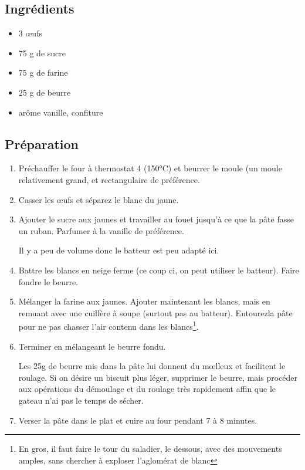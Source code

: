 \subsection*{Ingrédients}
\begin{itemize}
\item 3 œufs
\item 75 g de sucre
\item 75 g de farine
\item 25 g de beurre
\item arôme vanille, confiture
\end{itemize}

\subsection*{Préparation}
\begin{enumerate}
\item Préchauffer le four à thermostat 4 (150°C) et beurrer le moule (un moule relativement grand, et rectangulaire de préférence.
\item Casser les œufs et séparez le blanc du jaune.
\item Ajouter le sucre aux jaunes et travailler au fouet jusqu'à ce que la pâte fasse un ruban. Parfumer à la vanille de préférence.
\begin{remarque}
Il y a peu de volume donc le batteur est peu adapté ici.
\end{remarque}
\item Battre les blancs en neige ferme (ce coup ci, on peut utiliser le batteur). Faire fondre le beurre.
\item Mélanger la farine aux jaunes. Ajouter maintenant les blancs, mais en remuant avec une cuillère à soupe (surtout pas au batteur). \og Entourez\fg la pâte pour ne pas chasser l'air contenu dans les blancs\footnote{En gros, il faut faire le tour du saladier, le dessous, avec des mouvements amples, sans chercher à exploser l'aglomérat de blanc}.
\item Terminer en mélangeant le beurre fondu.
\begin{remarque}
Les 25g de beurre mis dans la pâte lui donnent du mœlleux et facilitent le roulage. Si on désire un biscuit plus léger, supprimer le beurre, mais procéder aux opérations du démoulage et du roulage très rapidement affin que le gateau n'ai pas le temps de sécher.
\end{remarque}
\item Verser la pâte dans le plat et cuire au four pendant 7 à 8 minutes.

\end{enumerate}
